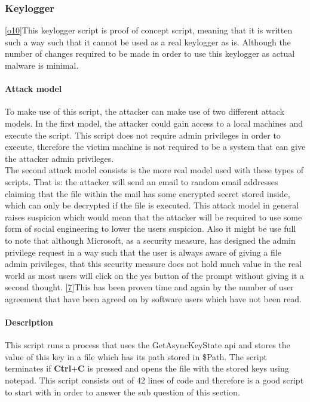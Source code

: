 \documentclass{article}%
\begin{document}
\subsubsection{Keylogger}
[\hyperlink{o10}{o10}]This keylogger script is proof of concept script, meaning that it is written such a way such that it cannot be used as a real keylogger as is. Although the number of changes required to be made in order to use this keylogger as actual malware is minimal.
\paragraph{Attack model}\hfill
\newline
To make use of this script, the attacker can make use of two different attack models. In the first model, the attacker could gain access to a local machines and execute the script. This script does not require admin privileges in order to execute, therefore the victim machine is not required to be a system that can give the attacker admin privileges.
\newline
\\
The second attack model consists is the more real model used with these types of scripts. That is: the attacker will send an email to random email addresses claiming that the file within the mail has some encrypted secret stored inside, which can only be decrypted if the file is executed. This attack model in general raises suspicion which would mean that the attacker will be required to use some form of social engineering to lower the users suspicion. Also it might be use full to note that although Microsoft, as a security measure, has designed the admin privilege request in a way such that the user is always aware of giving a file admin privileges, that this security measure does not hold much value in the real world as most users will click on the yes button of the prompt without giving it a second thought. [\hyperlink{7}{7}]This has been proven time and again by the number of user agreement that have been agreed on by software users which have not been read.
\paragraph{Description}\hfill\newline
This script runs a process that uses the GetAsyncKeyState api and stores the value of this key in a file which has its path stored in \$Path. The script terminates if \textbf{Ctrl$+$C} is pressed and opens the file with the stored keys using notepad. This script consists out of 42 lines of code and therefore is a good script to start with in order to answer the sub question of this section.
\end{document}
